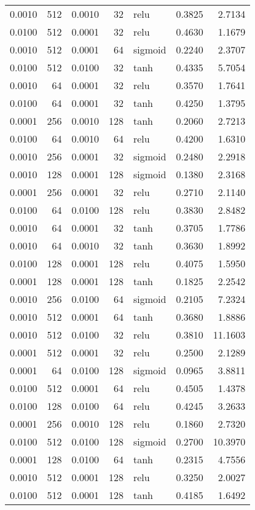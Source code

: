 \begin{table}
\begin{tabular}{rrrrlrr}
0.0010 & 512 & 0.0010 & 32 & relu & 0.3825 & 2.7134 \\
0.0100 & 512 & 0.0001 & 32 & relu & 0.4630 & 1.1679 \\
0.0010 & 512 & 0.0001 & 64 & sigmoid & 0.2240 & 2.3707 \\
0.0100 & 512 & 0.0100 & 32 & tanh & 0.4335 & 5.7054 \\
0.0010 & 64 & 0.0001 & 32 & relu & 0.3570 & 1.7641 \\
0.0100 & 64 & 0.0001 & 32 & tanh & 0.4250 & 1.3795 \\
0.0001 & 256 & 0.0010 & 128 & tanh & 0.2060 & 2.7213 \\
0.0100 & 64 & 0.0010 & 64 & relu & 0.4200 & 1.6310 \\
0.0010 & 256 & 0.0001 & 32 & sigmoid & 0.2480 & 2.2918 \\
0.0010 & 128 & 0.0001 & 128 & sigmoid & 0.1380 & 2.3168 \\
0.0001 & 256 & 0.0001 & 32 & relu & 0.2710 & 2.1140 \\
0.0100 & 64 & 0.0100 & 128 & relu & 0.3830 & 2.8482 \\
0.0010 & 64 & 0.0001 & 32 & tanh & 0.3705 & 1.7786 \\
0.0010 & 64 & 0.0010 & 32 & tanh & 0.3630 & 1.8992 \\
0.0100 & 128 & 0.0001 & 128 & relu & 0.4075 & 1.5950 \\
0.0001 & 128 & 0.0001 & 128 & tanh & 0.1825 & 2.2542 \\
0.0010 & 256 & 0.0100 & 64 & sigmoid & 0.2105 & 7.2324 \\
0.0010 & 512 & 0.0001 & 64 & tanh & 0.3680 & 1.8886 \\
0.0010 & 512 & 0.0100 & 32 & relu & 0.3810 & 11.1603 \\
0.0001 & 512 & 0.0001 & 32 & relu & 0.2500 & 2.1289 \\
0.0001 & 64 & 0.0100 & 128 & sigmoid & 0.0965 & 3.8811 \\
0.0100 & 512 & 0.0001 & 64 & relu & 0.4505 & 1.4378 \\
0.0100 & 128 & 0.0100 & 64 & relu & 0.4245 & 3.2633 \\
0.0001 & 256 & 0.0010 & 128 & relu & 0.1860 & 2.7320 \\
0.0100 & 512 & 0.0100 & 128 & sigmoid & 0.2700 & 10.3970 \\
0.0001 & 128 & 0.0100 & 64 & tanh & 0.2315 & 4.7556 \\
0.0010 & 512 & 0.0001 & 128 & relu & 0.3250 & 2.0027 \\
0.0100 & 512 & 0.0001 & 128 & tanh & 0.4185 & 1.6492 \\

\end{tabular}
\end{table}
